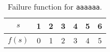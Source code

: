 \begin{table}[!ht]
    \centering
    \begin{tabular}{|c||c|c|c|c|c|c|}
        \hline
        $s$ & 1 & 2 & 3 & 4 & 5 & 6 \\
        \hline
        $f(s)$ & 0 & 1 & 2 & 3 & 4 & 5 \\
        \hline
    \end{tabular}
    \caption{Failure function for \texttt{aaaaaa}.}
    \label{tab:030403b}
\end{table}